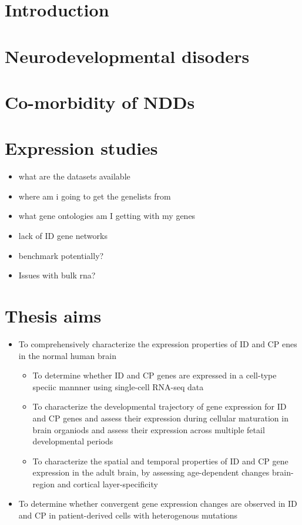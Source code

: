 \documentclass[12pt]{article}
\begin{document}
\section{Introduction}
\section{Neurodevelopmental disoders}
\section{Co-morbidity of NDDs}
\section{Expression studies}
\begin{itemize}
\item what are the datasets available 
\item where am i going to get the genelists from 
\item what gene ontologies am I getting with my genes 
\item lack of ID gene networks 
\item benchmark potentially?
\item Issues with bulk rna? 

\end{itemize}
\section{Thesis aims}

\begin{itemize}
    \item To comprehensively characterize the expression properties of ID and CP enes in the normal human brain
    \begin{itemize}
        \item To determine whether ID and CP genes are expressed in a cell-type speciic mannner using single-cell RNA-seq data
        \item To characterize the developmental trajectory of gene expression for ID and CP genes and assess their expression during cellular maturation in brain organiods and assess their expression across multiple fetail developmental periods 
        \item  To characterize the spatial and temporal properties of ID and CP gene expression in the adult brain, by assessing age-dependent changes  brain-region and cortical layer-specificity 
        
    \end{itemize}

    \item To determine whether convergent gene expression changes are observed in ID and CP in patient-derived cells with heterogenous mutations 

\end{itemize}
\end{document}
